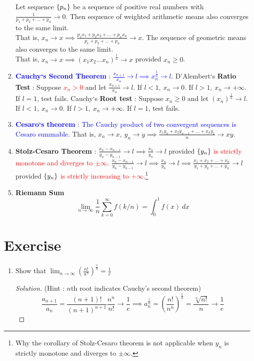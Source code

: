 \begin{enumerate}
	\subitem Let sequence $\{p_n\}$ be a sequence of positive real numbers with $\frac{1}{p_1+p_2+\dots+p_n} \to 0$. Then sequence of weighted arithmetic means also converges to the same limit.\\ That is, $x_n \to x \implies \frac{p_1x_1 + p_2x_2 + \dots + p_nx_n}{p_1+p_2+\dots+p_n} \to x$.
		\subitem The sequence of geometric means also converges to the same limit.\\ That is, $x_n \to x \implies (x_1x_2\dots x_n)^\frac{1}{n} \to x$ provided $x_n \ge 0$.
	\item \textcolor{blue}{\textbf{Cauchy`s Second Theorem} : $ \frac{x_{n+1}}{x_n} \to l \implies x_n^\frac{1}{n} \to l$.}
		\subitem D'Alembert`s \textbf{Ratio Test} : Suppose \textcolor{red}{$x_n > 0$} and let $\frac{x_{n+1}}{x_n} \to l$.
		If $l < 1,\ x_n \to 0$. If $l > 1,\ x_n \to +\infty$. If $l = 1$, test fails.
		\subitem Cauchy`s \textbf{Root test} : Suppose $x_n \ge 0$ and let $ (x_n)^{\frac{1}{n}} \to l$.
		If $l < 1,\ x_n \to 0$. If $l > 1,\ x_n \to +\infty$. If $l = 1$, test fails.
	\item \textcolor{blue}{\textbf{Cesaro`s theorem} : The Cauchy product of two convergent sequences is Cesaro summable.} That is, $x_n \to x,\ y_n \to y \implies \frac{x_1y_n + x_2y_{n-1} + \dots + x_ny_1}{n} \to xy$.
	\item \textbf{Stolz-Cesaro Theorem} : $\frac{x_n-x_{n-1}}{y_n-y_{n-1}} \to l \implies \frac{x_n}{y_n} \to l$ provided \textcolor{red}{$\{y_n\}$ is strictly monotone and diverges to $\pm \infty$.}
		\subitem $\frac{x_n-x_{n-1}}{y_n-y_{n-1}} \to l \implies \frac{x_n}{y_n} \to l \implies \frac{x_1+x_2+\dots+x_n}{y_1+y_2+\dots+y_n} \to l$ provided \textcolor{red}{$\{y_n\}$ is strictly increasing to $+\infty$.}\footnote{Why the corollary of Stolz-Cesaro theorem is not applicable when $y_n$ is strictly monotone and diverges to $\pm \infty$.}
	\item \textbf{Riemann Sum}
		\[ \lim_{n \to \infty} \frac{1}{n} \sum_{k=0}^\infty f(k/n) = \int_0^1 f(x)\ dx \]
\end{enumerate}

\section*{Exercise}
\begin{enumerate}
	\item Show that $\displaystyle \lim_{n \to \infty} \left( \frac{n!}{n^n} \right)^\frac{1}{n} = \frac{1}{e}$ 
		\begin{proof}[Solution] (Hint : $n$th root indicates Cauchy's second theorem)
			$$ \frac{a_{n+1}}{a_n} = \frac{(n+1)!}{(n+1)^{n+1}} \frac{n^n}{n!} \to \frac{1}{e} \implies a_n^\frac{1}{n} = \left(\frac{n!}{n^n}\right)^\frac{1}{n} = \frac{\sqrt[n]{n!}}{n} \to \frac{1}{e} $$
		\end{proof}
\end{enumerate}

